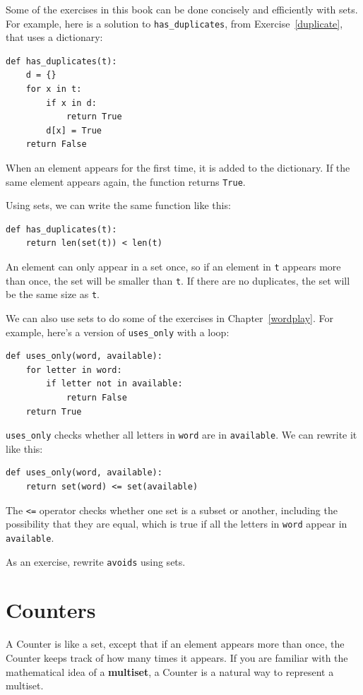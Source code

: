 \documentclass[10pt]{book}
\begin{document}
Some of the exercises in this book can be done concisely and
efficiently with sets.  For example, here is a solution to
\verb"has_duplicates", from
Exercise~\ref{duplicate}, that uses a dictionary:

\begin{verbatim}
def has_duplicates(t):
    d = {}
    for x in t:
        if x in d:
            return True
        d[x] = True
    return False
\end{verbatim}

When an element appears for the first time, it is added to the
dictionary.  If the same element appears again, the function returns
{\tt True}.

Using sets, we can write the same function like this:

\begin{verbatim}
def has_duplicates(t):
    return len(set(t)) < len(t)
\end{verbatim}
%
An element can only appear in a set once, so if an element in {\tt t}
appears more than once, the set will be smaller than {\tt t}.  If there
are no duplicates, the set will be the same size as {\tt t}.

We can also use sets to do some of the exercises in
Chapter~\ref{wordplay}.  For example, here's a version of
\verb"uses_only" with a loop:

\begin{verbatim}
def uses_only(word, available):
    for letter in word: 
        if letter not in available:
            return False
    return True
\end{verbatim}
%
\verb"uses_only" checks whether all letters in {\tt word} are
in {\tt available}.  We can rewrite it like this:

\begin{verbatim}
def uses_only(word, available):
    return set(word) <= set(available)
\end{verbatim}
%
The \verb"<=" operator checks whether one set is a subset or another,
including the possibility that they are equal, which is true if all
the letters in {\tt word} appear in {\tt available}.

As an exercise, rewrite \verb"avoids" using sets.


\section{Counters}

A Counter is like a set, except that if an element appears more
than once, the Counter keeps track of how many times it appears.
If you are familiar with the mathematical idea of a {\bf multiset},
a Counter is a natural way to represent a multiset.
\end{document}
